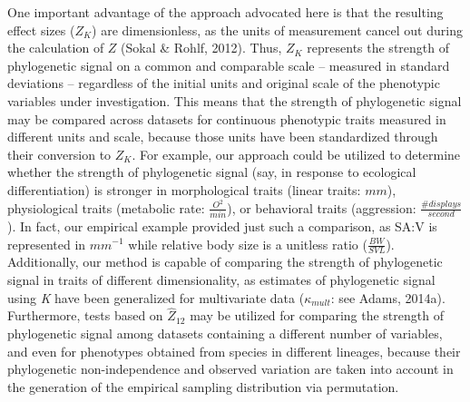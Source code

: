 \documentclass[
]{article}
\begin{document}
One important advantage of the approach advocated here is that the
resulting effect sizes (\(Z_K\)) are dimensionless, as the units of
measurement cancel out during the calculation of \(Z\) (Sokal \& Rohlf,
2012). Thus, \(Z_K\) represents the strength of phylogenetic signal on a
common and comparable scale -- measured in standard deviations --
regardless of the initial units and original scale of the phenotypic
variables under investigation. This means that the strength of
phylogenetic signal may be compared across datasets for continuous
phenotypic traits measured in different units and scale, because those
units have been standardized through their conversion to \(Z_K\). For
example, our approach could be utilized to determine whether the
strength of phylogenetic signal (say, in response to ecological
differentiation) is stronger in morphological traits (linear traits:
\(mm\)), physiological traits (metabolic rate: \(\frac{O^2}{min}\)), or
behavioral traits (aggression: \(\frac{\#{displays}}{second}\)). In
fact, our empirical example provided just such a comparison, as SA:V is
represented in \(mm^{-1}\) while relative body size is a unitless ratio
(\(\frac{BW}{SVL}\)). Additionally, our method is capable of comparing
the strength of phylogenetic signal in traits of different
dimensionality, as estimates of phylogenetic signal using \emph{K} have
been generalized for multivariate data (\(\kappa_{mult}\): see Adams,
2014a). Furthermore, tests based on \(\hat{Z}_{12}\) may be utilized for
comparing the strength of phylogenetic signal among datasets containing
a different number of variables, and even for phenotypes obtained from
species in different lineages, because their phylogenetic
non-independence and observed variation are taken into account in the
generation of the empirical sampling distribution via permutation.
\hfill\break
\end{document}
